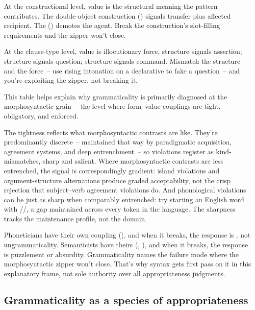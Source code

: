 At the constructional level, value is the structural meaning the pattern contributes. The double-object construction () signals transfer plus affected recipient. The  () demotes the agent. Break the construction's slot-filling requirements and the zipper won't close.

At the clause-type level, value is illocutionary force.  structure signals assertion;  structure signals question;  structure signals command. Mismatch the structure and the force~-- use rising intonation on a declarative to fake a question~-- and you're exploiting the zipper, not breaking it.

This table helps explain why grammaticality is primarily diagnosed at the morphosyntactic grain~-- the level where form--value couplings are tight, obligatory, and enforced.

The tightness reflects what morphosyntactic contrasts are like. They're predominantly discrete~-- maintained that way by paradigmatic acquisition, agreement systems, and deep entrenchment~-- so violations register as kind-mismatches, sharp and salient. Where morphosyntactic contrasts are less entrenched, the signal is correspondingly gradient: island violations and argument-structure alternations produce graded acceptability, not the crisp rejection that subject--verb agreement violations do. And phonological violations can be just as sharp when comparably entrenched: try starting an English word with //, a gap maintained across every token in the language. The sharpness tracks the maintenance profile, not the domain.

Phoneticians have their own coupling (), and when it breaks, the response is , not ungrammaticality. Semanticists have theirs (, ), and when it breaks, the response is puzzlement or absurdity. Grammaticality names the failure mode where the morphosyntactic zipper won't close. That's why syntax gets first pass on it in this explanatory frame, not sole authority over all appropriateness judgments.

\subsection{Grammaticality as a species of appropriateness}
\label{sec:14:appropriateness}

